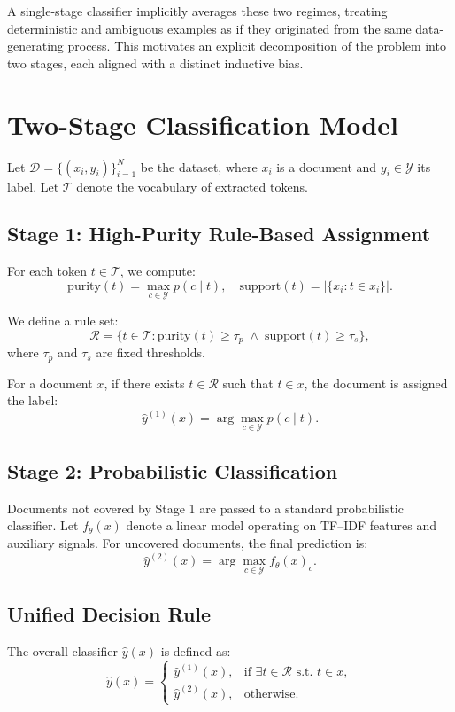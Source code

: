 A single-stage classifier implicitly averages these two regimes, treating deterministic and ambiguous examples as if they originated from the same data-generating process.
This motivates an explicit decomposition of the problem into two stages, each aligned with a distinct inductive bias.
\section{Two-Stage Classification Model}

Let $\mathcal{D} = \{(x_i, y_i)\}_{i=1}^N$ be the dataset, where $x_i$ is a document and $y_i \in \mathcal{Y}$ its label.
Let $\mathcal{T}$ denote the vocabulary of extracted tokens.

\subsection{Stage 1: High-Purity Rule-Based Assignment}

For each token $t \in \mathcal{T}$, we compute:
\[
\text{purity}(t) = \max_{c \in \mathcal{Y}} p(c \mid t), \quad
\text{support}(t) = |\{x_i : t \in x_i\}|.
\]

We define a rule set:
\[
\mathcal{R} = \{t \in \mathcal{T} : \text{purity}(t) \ge \tau_p \;\wedge\; \text{support}(t) \ge \tau_s\},
\]
where $\tau_p$ and $\tau_s$ are fixed thresholds.

For a document $x$, if there exists $t \in \mathcal{R}$ such that $t \in x$, the document is assigned the label:
\[
\hat{y}^{(1)}(x) = \arg\max_{c \in \mathcal{Y}} p(c \mid t).
\]
\subsection{Stage 2: Probabilistic Classification}

Documents not covered by Stage 1 are passed to a standard probabilistic classifier.
Let $f_\theta(x)$ denote a linear model operating on TF--IDF features and auxiliary signals.
For uncovered documents, the final prediction is:
\[
\hat{y}^{(2)}(x) = \arg\max_{c \in \mathcal{Y}} f_\theta(x)_c.
\]
\subsection{Unified Decision Rule}

The overall classifier $\hat{y}(x)$ is defined as:
\[
\hat{y}(x) =
\begin{cases}
\hat{y}^{(1)}(x), & \text{if } \exists t \in \mathcal{R} \text{ s.t. } t \in x, \\
\hat{y}^{(2)}(x), & \text{otherwise}.
\end{cases}
\]
